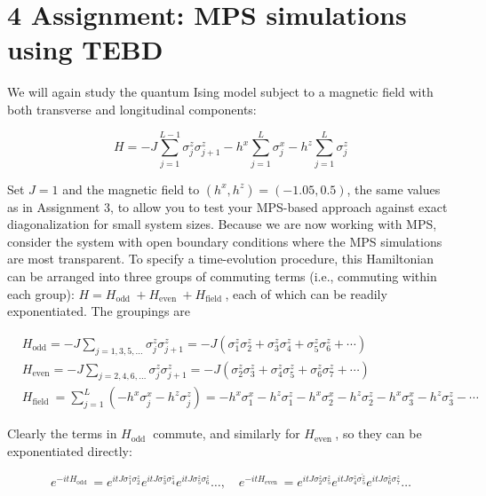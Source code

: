 \documentclass[12pt]{article}
\begin{document}
\section*{4 Assignment: MPS simulations using TEBD}
We will again study the quantum Ising model subject to a magnetic field with both transverse and longitudinal components:


\begin{equation*}
H=-J \sum_{j=1}^{L-1} \sigma_{j}^{z} \sigma_{j+1}^{z}-h^{x} \sum_{j=1}^{L} \sigma_{j}^{x}-h^{z} \sum_{j=1}^{L} \sigma_{j}^{z} \tag{15}
\end{equation*}


Set $J=1$ and the magnetic field to $\left(h^{x}, h^{z}\right)=(-1.05,0.5)$, the same values as in Assignment 3, to allow you to test your MPS-based approach against exact diagonalization for small system sizes. Because we are now working with MPS, consider the system with open boundary conditions where the MPS simulations are most transparent. To specify a time-evolution procedure, this Hamiltonian can be arranged into three groups of commuting terms (i.e., commuting within each group): $H=H_{\text {odd }}+H_{\text {even }}+H_{\text {field }}$, each of which can be readily exponentiated. The groupings are


\begin{align*}
& H_{\mathrm{odd}}=-J \sum_{j=1,3,5, \ldots} \sigma_{j}^{z} \sigma_{j+1}^{z}=-J\left(\sigma_{1}^{z} \sigma_{2}^{z}+\sigma_{3}^{z} \sigma_{4}^{z}+\sigma_{5}^{z} \sigma_{6}^{z}+\cdots\right)  \tag{16}\\
& H_{\mathrm{even}}=-J \sum_{j=2,4,6, \ldots} \sigma_{j}^{z} \sigma_{j+1}^{z}=-J\left(\sigma_{2}^{z} \sigma_{3}^{z}+\sigma_{4}^{z} \sigma_{5}^{z}+\sigma_{6}^{z} \sigma_{7}^{z}+\cdots\right)  \tag{17}\\
& H_{\text {field }}=\sum_{j=1}^{L}\left(-h^{x} \sigma_{j}^{x}-h^{z} \sigma_{j}^{z}\right)=-h^{x} \sigma_{1}^{x}-h^{z} \sigma_{1}^{z}-h^{x} \sigma_{2}^{x}-h^{z} \sigma_{2}^{z}-h^{x} \sigma_{3}^{x}-h^{z} \sigma_{3}^{z}-\cdots \tag{18}
\end{align*}


Clearly the terms in $H_{\text {odd }}$ commute, and similarly for $H_{\text {even }}$, so they can be exponentiated directly:


\begin{equation*}
e^{-i t H_{\text {odd }}}=e^{i t J \sigma_{1}^{z} \sigma_{2}^{z}} e^{i t J \sigma_{3}^{z} \sigma_{4}^{z}} e^{i t J \sigma_{5}^{z} \sigma_{6}^{z}} \ldots, \quad e^{-i t H_{\text {even }}}=e^{i t J \sigma_{2}^{z} \sigma_{5}^{z}} e^{i t J \sigma_{4}^{z} \sigma_{5}^{\tilde{z}}} e^{i t J \sigma_{6}^{z} \sigma_{7}^{z}} \ldots \tag{19}
\end{equation*}
\end{document}
